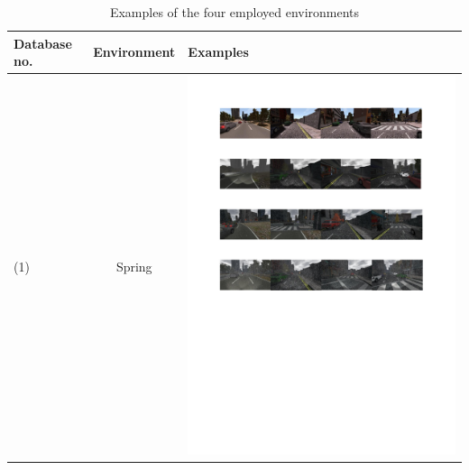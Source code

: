 \documentclass{svproc}
\begin{document}
\begin{table}[!t]
	\centering
	\caption{Examples of the four employed environments}
	\label{Table:Environments_Examples}
	\begin{tabular}{|C{1.5cm}|c|C{8.5cm}|}
		\hline
		\textbf{Database no.} & \textbf{Environment} & \textbf{Examples} \\ \hline
		(1)	& Spring & \begin{minipage}{.9\textwidth}\includegraphics[scale=.5,trim=2cm 24.5cm 2cm 2.5cm,clip]{examples.pdf}\end{minipage} \\ \hline

\end{tabular}
\end{table}
\end{document}
